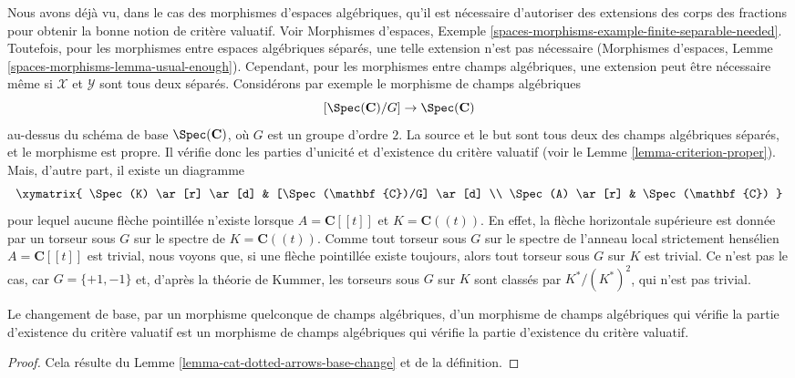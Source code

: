 \noindent
Nous avons d\'ej\`a vu, dans le cas des morphismes d'espaces alg\'ebriques,
qu'il est n\'ecessaire d'autoriser des extensions des corps des fractions
pour obtenir la bonne notion de crit\`ere valuatif.
Voir Morphismes d'espaces, Exemple
\ref{spaces-morphisms-example-finite-separable-needed}.
Toutefois, pour les morphismes entre espaces alg\'ebriques s\'epar\'es, une telle
extension n'est pas n\'ecessaire
(Morphismes d'espaces, Lemme \ref{spaces-morphisms-lemma-usual-enough}).
Cependant, pour les morphismes entre champs alg\'ebriques, une extension peut
\^etre n\'ecessaire m\^eme si $\mathcal{X}$ et $\mathcal{Y}$ sont tous deux s\'epar\'es.
Consid\'erons par exemple le morphisme de champs alg\'ebriques
$$
[\Spec(\mathbf{C})/G] \to \Spec(\mathbf{C})
$$
au-dessus du sch\'ema de base $\Spec(\mathbf{C})$,
o\`u $G$ est un groupe d'ordre $2$. La source et le but sont tous deux des
champs alg\'ebriques s\'epar\'es, et le morphisme est propre. Il
v\'erifie donc les parties d'unicit\'e et d'existence du crit\`ere valuatif
(voir le Lemme \ref{lemma-criterion-proper}).
Mais, d'autre part, il existe un diagramme
$$
\xymatrix{
\Spec(K) \ar[r] \ar[d] & [\Spec(\mathbf{C})/G] \ar[d] \\
\Spec(A) \ar[r] & \Spec(\mathbf{C})
}
$$
pour lequel aucune fl\`eche pointill\'ee n'existe lorsque $A = \mathbf{C}[[t]]$ et
$K = \mathbf{C}((t))$. En effet, la fl\`eche horizontale sup\'erieure est donn\'ee
par un torseur sous $G$ sur le spectre de $K = \mathbf{C}((t))$. Comme tout torseur sous $G$
sur le spectre de l'anneau local strictement hens\'elien $A = \mathbf{C}[[t]]$ est trivial, nous voyons
que, si une fl\`eche pointill\'ee existe toujours, alors tout torseur sous $G$ sur
$K$ est trivial. Ce n'est pas le cas, car $G = \{+1, -1\}$
et, d'apr\`es la th\'eorie de Kummer, les torseurs sous $G$ sur $K$ sont class\'es par
$K^*/(K^*)^2$, qui n'est pas trivial.

\begin{lemma}
\label{lemma-base-change-existence}
Le changement de base, par un morphisme quelconque de champs alg\'ebriques,
d'un morphisme de champs alg\'ebriques qui v\'erifie la
partie d'existence du crit\`ere valuatif est un morphisme de champs alg\'ebriques
qui v\'erifie la partie d'existence du crit\`ere valuatif.
\end{lemma}

\begin{proof}
Cela r\'esulte du Lemme \ref{lemma-cat-dotted-arrows-base-change}
et de la d\'efinition.
\end{proof}

